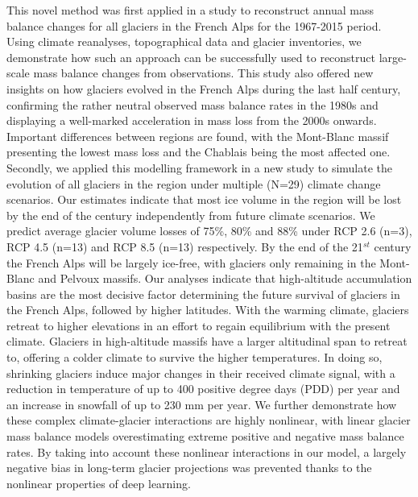 This novel method was first applied in a study to reconstruct annual mass balance changes for all glaciers in the French Alps for the 1967-2015 period. Using climate reanalyses, topographical data and glacier inventories, we demonstrate how such an approach can be successfully used to reconstruct large-scale mass balance changes from observations. This study also offered new insights on how glaciers evolved in the French Alps during the last half century, confirming the rather neutral observed mass balance rates in the 1980s and displaying a well-marked acceleration in mass loss from the 2000s onwards. Important differences between regions are found, with the Mont-Blanc massif presenting the lowest mass loss and the Chablais being the most affected one. Secondly, we applied this modelling framework in a new study to simulate the evolution of all glaciers in the region under multiple (N=29) climate change scenarios. Our estimates indicate that most ice volume in the region will be lost by the end of the century independently from future climate scenarios. We predict average glacier volume losses of 75\%, 80\% and 88\% under RCP 2.6 (n=3), RCP 4.5 (n=13) and RCP 8.5 (n=13) respectively. By the end of the 21$^{st}$ century the French Alps will be largely ice-free, with glaciers only remaining in the Mont-Blanc and Pelvoux massifs. Our analyses indicate that high-altitude accumulation basins are the most decisive factor determining the future survival of glaciers in the French Alps, followed by higher latitudes. With the warming climate, glaciers retreat to higher elevations in an effort to regain equilibrium with the present climate. Glaciers in high-altitude massifs have a larger altitudinal span to retreat to, offering a colder climate to survive the higher temperatures. In doing so, shrinking glaciers induce major changes in their received climate signal, with a reduction in temperature of up to 400 positive degree days (PDD) per year and an increase in snowfall of up to 230 mm per year. We further demonstrate how these complex climate-glacier interactions are highly nonlinear, with linear glacier mass balance models overestimating extreme positive and negative mass balance rates. By taking into account these nonlinear interactions in our model, a largely negative bias in long-term glacier projections was prevented thanks to the nonlinear properties of deep learning. 

